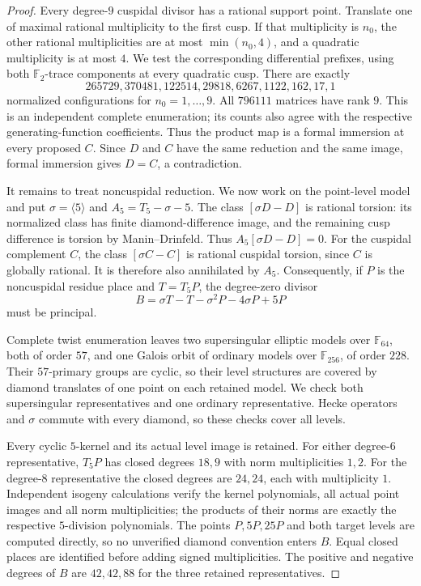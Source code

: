 \begin{proof}
Every degree-$9$ cuspidal divisor has a rational support point.
Translate one of maximal rational multiplicity to the first cusp.
If that multiplicity is $n_0$, the other rational multiplicities
are at most $\min(n_0,4)$, and a quadratic multiplicity is at most
$4$. We test the corresponding differential prefixes, using both
$\mathbb F_2$-trace components at every quadratic cusp.
There are exactly
\[
 265729,370481,122514,29818,6267,1122,162,17,1
\]
normalized configurations for $n_0=1,\ldots,9$.
All $796111$ matrices have rank $9$.
This is an independent complete enumeration; its counts also
agree with the respective generating-function coefficients.
Thus the product map is a formal immersion at every proposed
$C$. Since $D$ and $C$ have the same reduction and the same image,
formal immersion gives $D=C$, a contradiction.

It remains to treat noncuspidal reduction.
We now work on the point-level model and put
$\sigma=\langle5\rangle$ and $A_5=T_5-\sigma-5$.
The class $[\sigma D-D]$ is rational torsion: its normalized
class has finite diamond-difference image, and the remaining
cusp difference is torsion by Manin--Drinfeld.
Thus $A_5[\sigma D-D]=0$.
For the cuspidal complement $C$, the class $[\sigma C-C]$
is rational cuspidal torsion, since $C$ is globally rational.
It is therefore also annihilated by $A_5$.
Consequently, if $P$ is the noncuspidal residue place and
$T=T_5P$, the degree-zero divisor
\[
 B=\sigma T-T-\sigma^2P-4\sigma P+5P
\]
must be principal.

Complete twist enumeration leaves two supersingular elliptic
models over $\mathbb F_{64}$, both of order $57$, and one
Galois orbit of ordinary models over $\mathbb F_{256}$, of order
$228$. Their $57$-primary groups are cyclic, so their level
structures are covered by diamond translates of one point on
each retained model. We check both supersingular representatives
and one ordinary representative. Hecke operators and $\sigma$
commute with every diamond, so these checks cover all levels.

Every cyclic $5$-kernel and its actual level image is retained.
For either degree-$6$ representative, $T_5P$ has closed degrees
$18,9$ with norm multiplicities $1,2$.
For the degree-$8$ representative the closed degrees are $24,24$,
each with multiplicity $1$.
Independent isogeny calculations verify the kernel polynomials,
all actual point images and all norm multiplicities; the products
of their norms are exactly the respective $5$-division polynomials.
The points $P,5P,25P$ and both target levels are computed directly,
so no unverified diamond convention enters $B$.
Equal closed places are identified before adding signed
multiplicities. The positive and negative degrees of $B$ are
$42,42,88$ for the three retained representatives.


\end{proof}
